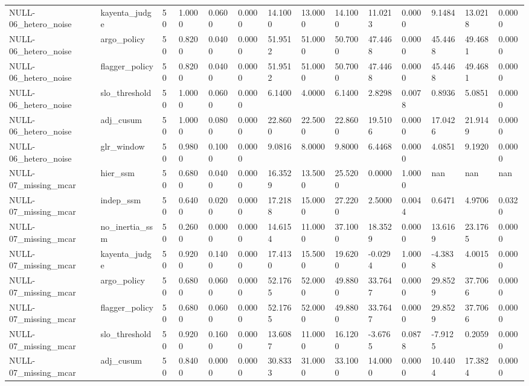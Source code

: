 \begin{table}[htbp]
\begin{tabular}{llllllllllllll}
NULL-06\_hetero\_noise & kayenta\_judge & 50 & 1.0000 & 0.0600 & 0.0000 & 14.1000 & 13.0000 & 14.1000 & 11.0213 & 0.0000 & 9.1484 & 13.0218 & 0.0000 \\
NULL-06\_hetero\_noise & argo\_policy & 50 & 0.8200 & 0.0400 & 0.0000 & 51.9512 & 51.0000 & 50.7000 & 47.4468 & 0.0000 & 45.4468 & 49.4681 & 0.0000 \\
NULL-06\_hetero\_noise & flagger\_policy & 50 & 0.8200 & 0.0400 & 0.0000 & 51.9512 & 51.0000 & 50.7000 & 47.4468 & 0.0000 & 45.4468 & 49.4681 & 0.0000 \\
NULL-06\_hetero\_noise & slo\_threshold & 50 & 1.0000 & 0.0600 & 0.0000 & 6.1400 & 4.0000 & 6.1400 & 2.8298 & 0.0078 & 0.8936 & 5.0851 & 0.0000 \\
NULL-06\_hetero\_noise & adj\_cusum & 50 & 1.0000 & 0.0800 & 0.0000 & 22.8600 & 22.5000 & 22.8600 & 19.5106 & 0.0000 & 17.0426 & 21.9149 & 0.0000 \\
NULL-06\_hetero\_noise & glr\_window & 50 & 0.9800 & 0.1000 & 0.0000 & 9.0816 & 8.0000 & 9.8000 & 6.4468 & 0.0000 & 4.0851 & 9.1920 & 0.0000 \\
NULL-07\_missing\_mcar & hier\_ssm & 50 & 0.6800 & 0.0400 & 0.0000 & 16.3529 & 13.5000 & 25.5200 & 0.0000 & 1.0000 & nan & nan & nan \\
NULL-07\_missing\_mcar & indep\_ssm & 50 & 0.6400 & 0.0200 & 0.0000 & 17.2188 & 15.0000 & 27.2200 & 2.5000 & 0.0044 & 0.6471 & 4.9706 & 0.0320 \\
NULL-07\_missing\_mcar & no\_inertia\_ssm & 50 & 0.2600 & 0.0000 & 0.0000 & 14.6154 & 11.0000 & 37.1000 & 18.3529 & 0.0000 & 13.6169 & 23.1765 & 0.0000 \\
NULL-07\_missing\_mcar & kayenta\_judge & 50 & 0.9200 & 0.1400 & 0.0000 & 17.4130 & 15.5000 & 19.6200 & -0.0294 & 1.0000 & -4.3838 & 4.0015 & 0.0000 \\
NULL-07\_missing\_mcar & argo\_policy & 50 & 0.6800 & 0.0600 & 0.0000 & 52.1765 & 52.0000 & 49.8800 & 33.7647 & 0.0000 & 29.8529 & 37.7066 & 0.0000 \\
NULL-07\_missing\_mcar & flagger\_policy & 50 & 0.6800 & 0.0600 & 0.0000 & 52.1765 & 52.0000 & 49.8800 & 33.7647 & 0.0000 & 29.8529 & 37.7066 & 0.0000 \\
NULL-07\_missing\_mcar & slo\_threshold & 50 & 0.9200 & 0.1600 & 0.0000 & 13.6087 & 11.0000 & 16.1200 & -3.6765 & 0.0878 & -7.9125 & 0.2059 & 0.0000 \\
NULL-07\_missing\_mcar & adj\_cusum & 50 & 0.8400 & 0.0000 & 0.0000 & 30.8333 & 31.0000 & 33.1000 & 14.0000 & 0.0000 & 10.4404 & 17.3824 & 0.0000 \\

\end{tabular}
\end{table}
